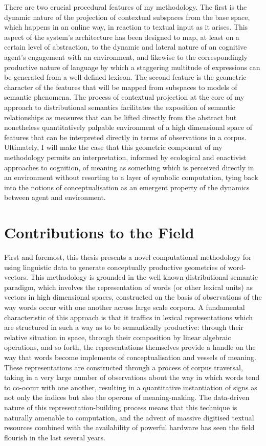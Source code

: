 There are two crucial procedural features of my methodology.  The first is the dynamic nature of the projection of contextual subspaces from the base space, which happens in an online way, in reaction to textual input as it arises.  This aspect of the system's architecture has been designed to map, at least on a certain level of abstraction, to the dynamic and lateral nature of an cognitive agent's engagement with an environment, and likewise to the correspondingly productive nature of language by which a staggering multitude of expressions can be generated from a well-defined lexicon.  The second feature is the geometric character of the features that will be mapped from subspaces to models of semantic phenomena.  The process of contextual projection at the core of my approach to distributional semantics facilitates the exposition of semantic relationships as measures that can be lifted directly from the abstract but nonetheless quantitatively palpable environment of a high dimensional space of features that can be interpreted directly in terms of observations in a corpus.  Ultimately, I will make the case that this geometric component of my methodology permits an interpretation, informed by ecological and enactivist approaches to cognition, of meaning as something which is perceived directly in an environment without resorting to a layer of symbolic computation, tying back into the notions of conceptualisation as an emergent property of the dynamics between agent and environment.

\section{Contributions to the Field}
First and foremost, this thesis presents a novel computational methodology for using linguistic data to generate conceptually productive geometries of word-vectors.  This methodology is grounded in the well known distributional semantic paradigm, which involves the representation of words (or other lexical units) as vectors in high dimensional spaces, constructed on the basis of observations of the way words occur with one another across large scale corpora.  A fundamental characteristic of this approach is that it traffics in lexical representations which are structured in such a way as to be semantically productive: through their relative situation in space, through their composition by linear algebraic operations, and so forth, the representations themselves provide a handle on the way that words become implements of conceptualisation and vessels of meaning.  These representations are constructed through a process of corpus traversal, taking in a very large number of observations about the way in which words tend to co-occur with one another, resulting in a quantitative instantiation of signs as not only the indices but also the operons of meaning-making.  The data-driven nature of this representation-building process means that this technique is naturally amenable to computation, and the advent of massive digitised textual resources combined with the availability of powerful hardware has seen the field flourish in the last several years.

